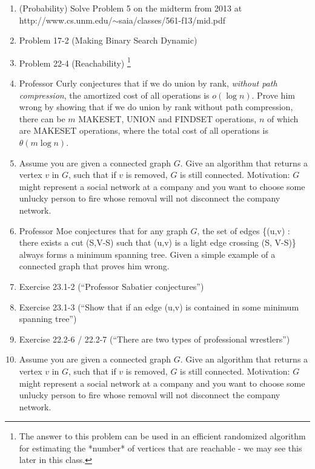 \documentclass[titlepage]{article}\usepackage[]{graphicx}\usepackage[]{color}
\begin{document}
\begin{enumerate}

	\item (Probability) Solve Problem 5 on the midterm from 2013 at\\
		http://www.cs.unm.edu/$\sim$saia/classes/561-f13/mid.pdf

	\item Problem 17-2 (Making Binary Search Dynamic)

	\item Problem 22-4 (Reachability) \footnote{The answer to this problem
			can be used in an efficient randomized algorithm for estimating the
			*number* of vertices that are reachable - we may see this later in
		this class.}

	\item Professor Curly conjectures that if we do union by rank,
		\emph{without path compression}, the amortized cost of all operations
		is $o(\log n)$.  Prove him wrong by showing that if we do union by
		rank without path compression, there can be $m$ MAKESET, UNION and
		FINDSET operations, $n$ of which are MAKESET operations, where the
		total cost of all operations is $\theta(m \log n)$.


	\item Assume you are given a connected graph $G$.  Give an algorithm
		that returns a vertex $v$ in $G$, such that if $v$ is removed, $G$ is
		still connected.  Motivation: $G$ might represent a social network at
		a company and you want to choose some unlucky person to fire whose
		removal will not disconnect the company network.


	\item Professor Moe conjectures that for any graph $G$, the set of
		edges \{(u,v) : there exists a cut (S,V-S) such that (u,v) is a light
		edge crossing (S, V-S)\} always forms a minimum spanning tree.  Given
		a simple example of a connected graph that proves him wrong.


	\item Exercise 23.1-2 (``Professor Sabatier conjectures'')

	\item Exercise 23.1-3 (``Show that if an edge (u,v) is contained in
		some minimum spanning tree'')

	\item Exercise 22.2-6 / 22.2-7 (``There are two types of professional
		wrestlers'')

	\item Assume you are given a connected graph $G$.  Give an algorithm
		that returns a vertex $v$ in $G$, such that if $v$ is removed, $G$ is
		still connected.  Motivation: $G$ might represent a social network at
		a company and you want to choose some unlucky person to fire whose
		removal will not disconnect the company network.

\end{enumerate}









  
\end{document}
